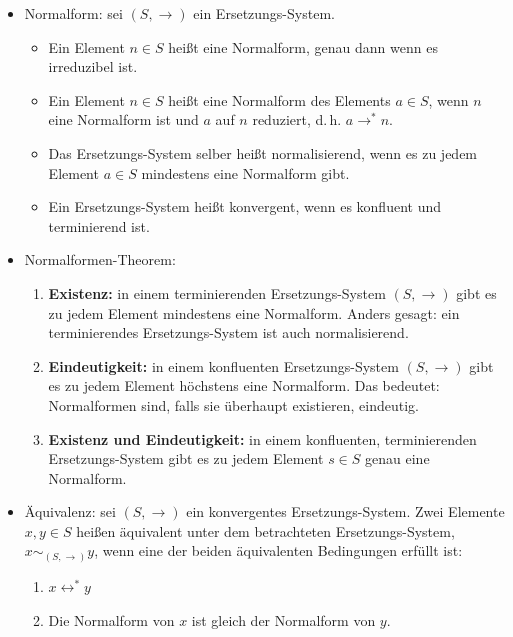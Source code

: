 \documentclass[
  a4paper,
  11pt,
]{scrartcl}
\begin{document}
\begin{itemize}
  \item Normalform: sei $(S, \rightarrow)$ ein Ersetzungs-System.
    \begin{itemize}
      \item Ein Element $n \in S$ heißt eine Normalform, genau dann wenn es
        irreduzibel ist.
      \item Ein Element $n \in S$ heißt eine Normalform des Elements $a \in S$,
        wenn $n$ eine Normalform ist und $a$ auf $n$ reduziert, d.\,h. $a
        \rightarrow^* n$.
      \item Das Ersetzungs-System selber heißt normalisierend, wenn es zu jedem
        Element $a \in S$ mindestens eine Normalform gibt.
      \item Ein Ersetzungs-System heißt konvergent, wenn es konfluent und
        terminierend ist.
    \end{itemize}

  \item Normalformen-Theorem:
    \begin{enumerate}
      \item \textbf{Existenz:} in einem terminierenden Ersetzungs-System $(S,
        \rightarrow)$ gibt es zu jedem Element mindestens eine Normalform.
        Anders gesagt: ein terminierendes Ersetzungs-System ist auch
        normalisierend.
      \item \textbf{Eindeutigkeit:} in einem konfluenten Ersetzungs-System $(S,
        \rightarrow)$ gibt es zu jedem Element höchstens eine Normalform. Das
        bedeutet: Normalformen sind, falls sie überhaupt existieren, eindeutig.
      \item \textbf{Existenz und Eindeutigkeit:} in einem konfluenten,
        terminierenden Ersetzungs-System gibt es zu jedem Element $s \in S$
        genau eine Normalform.
    \end{enumerate}

  \item Äquivalenz: sei $(S, \rightarrow)$ ein konvergentes Ersetzungs-System.
    Zwei Elemente $x, y \in S$ heißen äquivalent unter dem betrachteten
    Ersetzungs-System, $x \sim_{(S, \rightarrow)} y$, wenn eine der beiden
    äquivalenten Bedingungen erfüllt ist:
    \begin{enumerate}
      \item $x \leftrightarrow^* y$
      \item Die Normalform von $x$ ist gleich der Normalform von $y$.
    \end{enumerate}
\end{itemize}
\end{document}
